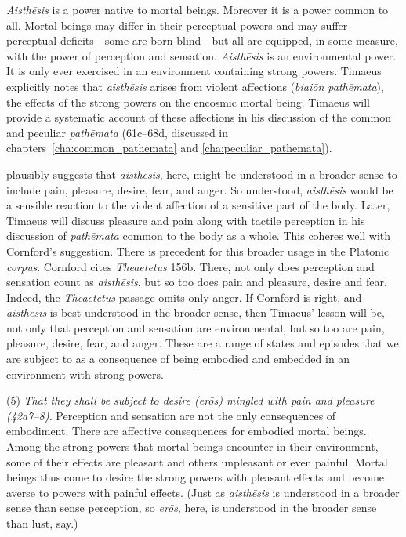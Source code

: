\emph{Aisthēsis} is a power native to mortal beings. Moreover it is a power common to all. Mortal beings may differ in their perceptual powers and may suffer perceptual deficits---some are born blind---but all are equipped, in some measure, with the power of perception and sensation. \emph{Aisthēsis} is an environmental power. It is only ever exercised in an environment containing strong powers. Timaeus explicitly notes that \emph{aisthēsis} arises from violent affections (\emph{biaiōn pathēmata}), the effects of the strong powers on the encosmic mortal being. Timaeus will provide a systematic account of these affections in his discussion of the common and peculiar \emph{pathēmata} (61c--68d, discussed in chapters~\ref{cha:common_pathemata} and \ref{cha:peculiar_pathemata}).

\citet[143 n2]{Cornford:1935fk} plausibly suggests that \emph{aisthēsis}, here, might be understood in a broader sense to include pain, pleasure, desire, fear, and anger. So understood, \emph{aisthēsis} would be a sensible reaction to the violent affection of a sensitive part of the body. Later, Timaeus will discuss pleasure and pain along with tactile perception in his discussion of \emph{pathēmata} common to the body as a whole. This coheres well with Cornford's suggestion. There is precedent for this broader usage in the Platonic \emph{corpus}. Cornford cites \emph{Theaetetus} 156b. There, not only does perception and sensation count as \emph{aisthēsis}, but so too does pain and pleasure, desire and fear. Indeed, the \emph{Theaetetus} passage omits only anger. If Cornford is right, and \emph{aisthēsis} is best understood in the broader sense, then Timaeus' lesson will be, not only that perception and sensation are environmental, but so too are pain, pleasure, desire, fear, and anger. These are a range of states and episodes that we are subject to as a consequence of being embodied and embedded in an environment with strong powers.

(5) \emph{That they shall be subject to desire (\emph{erōs}) mingled with pain and pleasure (42a7--8).} Perception and sensation are not the only consequences of embodiment. There are affective consequences for embodied mortal beings.  Among the strong powers that mortal beings encounter in their environment, some of their effects are pleasant and others unpleasant or even painful. Mortal beings thus come to desire the strong powers with pleasant effects and become averse to powers with painful effects. (Just as \emph{aisthēsis} is understood in a broader sense than sense perception, so \emph{erōs}, here, is understood in the broader sense than lust, say.) 

